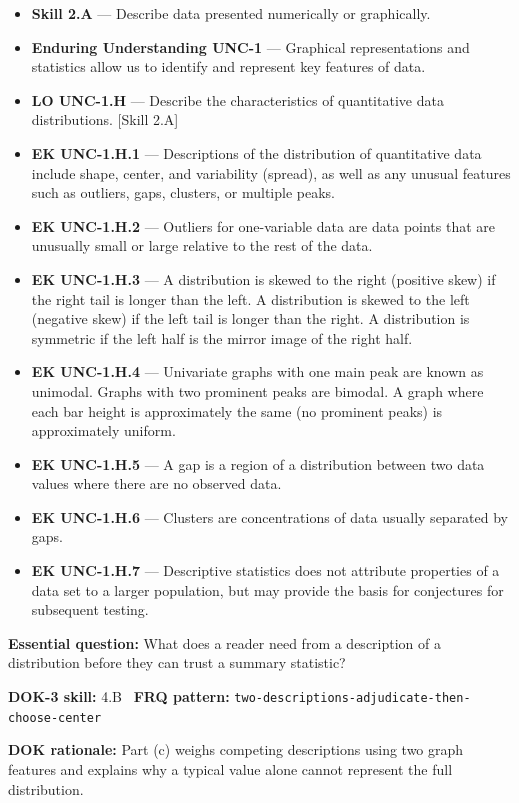 \documentclass[11pt]{article}
\begin{document}


{\small
\begin{itemize}[leftmargin=1.5em,itemsep=2pt,topsep=2pt]
  \item \textbf{Skill 2.A} --- Describe data presented numerically or graphically.
  \item \textbf{Enduring Understanding UNC-1} --- Graphical representations and statistics allow us to identify and represent key features of data.
  \item \textbf{LO UNC-1.H} --- Describe the characteristics of quantitative data distributions. [Skill 2.A]
  \item \textbf{EK UNC-1.H.1} --- Descriptions of the distribution of quantitative data include shape, center, and variability (spread), as well as any unusual features such as outliers, gaps, clusters, or multiple peaks.
  \item \textbf{EK UNC-1.H.2} --- Outliers for one-variable data are data points that are unusually small or large relative to the rest of the data.
  \item \textbf{EK UNC-1.H.3} --- A distribution is skewed to the right (positive skew) if the right tail is longer than the left. A distribution is skewed to the left (negative skew) if the left tail is longer than the right. A distribution is symmetric if the left half is the mirror image of the right half.
  \item \textbf{EK UNC-1.H.4} --- Univariate graphs with one main peak are known as unimodal. Graphs with two prominent peaks are bimodal. A graph where each bar height is approximately the same (no prominent peaks) is approximately uniform.
  \item \textbf{EK UNC-1.H.5} --- A gap is a region of a distribution between two data values where there are no observed data.
  \item \textbf{EK UNC-1.H.6} --- Clusters are concentrations of data usually separated by gaps.
  \item \textbf{EK UNC-1.H.7} --- Descriptive statistics does not attribute properties of a data set to a larger population, but may provide the basis for conjectures for subsequent testing.
\end{itemize}
}
\textbf{Essential question:} What does a reader need from a description of a distribution before they can trust a summary statistic?\par
\textbf{DOK-3 skill:} 4.B \textperiodcentered\ \textbf{FRQ pattern:} {\small\texttt{two-\allowbreak{}descriptions-\allowbreak{}adjudicate-\allowbreak{}then-\allowbreak{}choose-\allowbreak{}center}}\par
\textbf{DOK rationale:} Part (c) weighs competing descriptions using two graph features and explains why a typical value alone cannot represent the full distribution.\par
\end{document}

